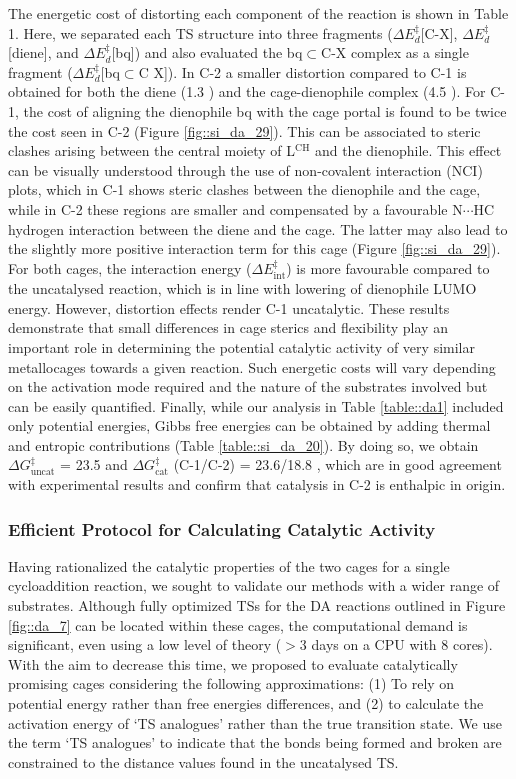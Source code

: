 \documentclass[../../main.tex]{subfiles}
\begin{document}
The energetic cost of distorting each component of the reaction is shown in Table 1. Here, we separated each TS structure into three fragments ($\Delta E_d^\ddagger$[C-X], $\Delta E_d^\ddagger$[diene], and $\Delta E_d^\ddagger$[bq]) and also evaluated the bq$\subset$C-X complex as a single fragment ($\Delta E_d^\ddagger$[bq$\subset$C X]). In C-2 a smaller distortion compared to C-1 is obtained for both the diene (1.3 \kcal) and the cage-dienophile complex (4.5 \kcal). For C-1, the cost of aligning the dienophile bq with the cage portal is found to be twice the cost seen in C-2 (Figure \ref{fig::si_da_29}). This can be associated to steric clashes arising between the central moiety of L${}^\text{CH}$ and the dienophile. This effect can be visually understood through the use of non-covalent interaction (NCI) plots, which in C-1 shows steric clashes between the dienophile and the cage, while in C-2 these regions are smaller and compensated by a favourable N$\cdots$HC hydrogen interaction between the diene and the cage. The latter may also lead to the slightly more positive interaction term for this cage (Figure \ref{fig::si_da_29}). For both cages, the interaction energy ($\Delta E^\ddagger_\text{int}$) is more favourable compared to the uncatalysed reaction, which is in line with lowering of dienophile LUMO energy. However, distortion effects render C-1 uncatalytic. These results demonstrate that small differences in cage sterics and flexibility play an important role in determining the potential catalytic activity of very similar metallocages towards a given reaction. Such energetic costs will vary depending on the activation mode required and the nature of the substrates involved but can be easily quantified. 
Finally, while our analysis in Table \ref{table::da1} included only potential energies, Gibbs free energies can be obtained by adding thermal and entropic contributions (Table \ref{table::si_da_20}). By doing so, we obtain $\Delta G_\text{uncat}^\ddagger$ = 23.5 \kcalx and $\Delta G_\text{cat}^\ddagger$ (C-1/C-2) = 23.6/18.8 \kcal, which are in good agreement with experimental results and confirm that catalysis in C-2 is enthalpic in origin.

\subsubsection{Efficient Protocol for Calculating Catalytic Activity}

Having rationalized the catalytic properties of the two cages for a single cycloaddition reaction, we sought to validate our methods with a wider range of substrates. Although fully optimized TSs for the DA reactions outlined in Figure \ref{fig::da_7} can be located within these cages, the computational demand is significant, even using a low level of theory ($>3$ days on a CPU with 8 cores). With the aim to decrease this time, we proposed to evaluate catalytically promising cages considering the following approximations: (1) To rely on potential energy rather than free energies differences, and (2) to calculate the activation energy of ‘TS analogues’ rather than the true transition state. We use the term ‘TS analogues’ to indicate that the bonds being formed and broken are constrained to the distance values found in the uncatalysed TS. 
\end{document}
